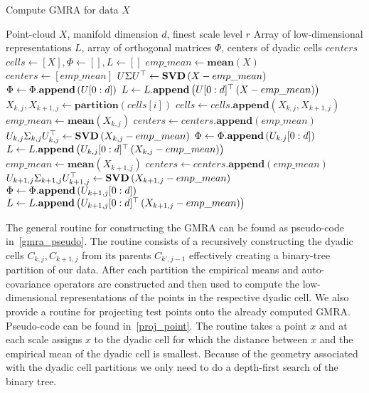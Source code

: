 \documentclass{article}
\begin{document}
  \begin{algorithm}[t]
    \caption{Compute GMRA for data $X$}
    \label{gmra_pseudo}
    \begin{algorithmic}
      \REQUIRE Point-cloud $X$, manifold dimension $d$, finest scale level $r$
      \ENSURE Array of low-dimensional representations $L$, array of orthogonal matrices $\Phi$, centers of dyadic cells $centers$
      \STATE $cells \leftarrow [X],\Phi \leftarrow [], L \leftarrow []$
      \STATE $emp\_mean \leftarrow \mathbf{mean}\left(X\right)$
      \STATE $centers \leftarrow [emp\_mean]$
      \STATE ${U}\Sigma{U}^{\top} \leftarrow \mathbf{SVD}\left(X-emp\_mean\right)$
      \STATE $\Phi \leftarrow \Phi.\mathbf{append}\left({U}[0:d]\right)$
      \STATE $L \leftarrow L.\mathbf{append}\left({U}[0:d]^{\top}\left(X-emp\_mean\right)\right)$
      \STATE $X_{k,j},X_{k+1,j} \leftarrow \mathbf{partition}\left(cells[i]\right)$
      \STATE $cells \leftarrow cells.\mathbf{append}\left(X_{k,j},X_{k+1,j}\right)$
      \STATE $emp\_mean \leftarrow \mathbf{mean}\left(X_{k,j}\right)$
      \STATE $centers \leftarrow centers.\mathbf{append}\left(emp\_mean\right)$
      \STATE ${U}_{k,j}\Sigma_{k,j}{U}_{k,j}^{\top} \leftarrow \mathbf{SVD}\left(X_{k,j}-emp\_mean\right)$
      \STATE $\Phi \leftarrow \Phi.\mathbf{append}\left({U}_{k,j}[0:d]\right)$
      \STATE $L \leftarrow L.\mathbf{append}\left({U}_{k,j}[0:d]^{\top}\left(X_{k,j}-emp\_mean\right)\right)$
      \STATE $emp\_mean \leftarrow \mathbf{mean}\left(X_{k+1,j}\right)$
      \STATE $centers \leftarrow centers.\mathbf{append}\left(emp\_mean\right)$
      \STATE ${U}_{k+1,j}\Sigma_{k+1,j}{U}_{k+1,j}^{\top} \leftarrow \mathbf{SVD}\left(X_{k+1,j}-emp\_mean\right)$
      \STATE $\Phi \leftarrow \Phi.\mathbf{append}\left({U}_{k+1,j}[0:d]\right)$
      \STATE $L \leftarrow L.\mathbf{append}\left({U}_{k+1,j}[0:d]^{\top}\left(X_{k+1,j}-emp\_mean\right)\right)$
      \ENDFOR
    \end{algorithmic}
  \end{algorithm}
  The general routine for constructing the GMRA can be found as pseudo-code in~\ref{gmra_pseudo}. The routine consists of a recursively constructing the dyadic cells $C_{k,j},C_{k+1,j}$ from its parents $C_{k',j-1}$ effectively creating a binary-tree partition of our data. After each partition the empirical means and auto-covariance operators are constructed and then used to compute the low-dimensional representations of the points in the respective dyadic cell. We also provide a routine for projecting test points onto the already computed GMRA. Pseudo-code can be found in~\ref{proj_point}. The routine takes a point $x$ and at each scale assigns $x$ to the dyadic cell for which the distance between $x$ and the empirical mean of the dyadic cell is smallest. Because of the geometry associated with the dyadic cell partitions we only need to do a depth-first search of the binary tree.
\end{document}
